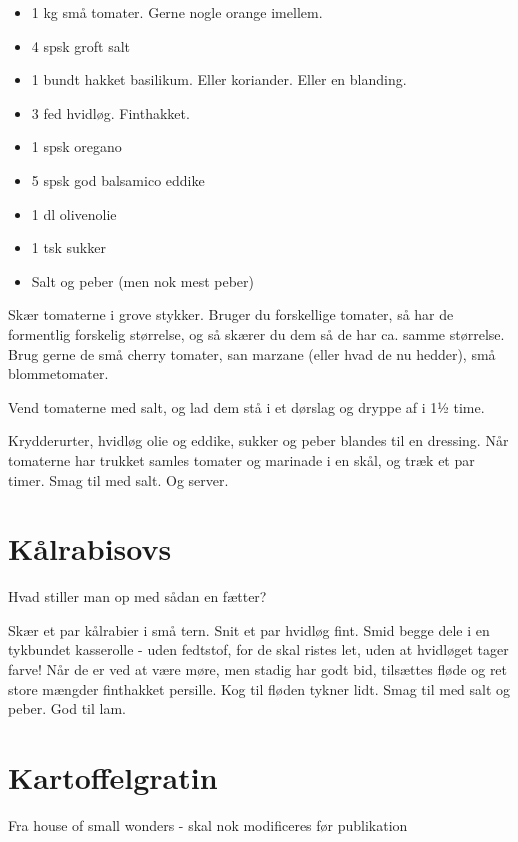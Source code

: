 \documentclass[
  letterpaper,
  DIV=11,
  numbers=noendperiod]{scrreprt}
\providecommand{\tightlist}{%
  \setlength{\itemsep}{0pt}\setlength{\parskip}{0pt}}\usepackage{longtable,booktabs,array}
\begin{document}
\begin{itemize}
\tightlist
\item
  1 kg små tomater. Gerne nogle orange imellem.
\item
  4 spsk groft salt
\item
  1 bundt hakket basilikum. Eller koriander. Eller en blanding.
\item
  3 fed hvidløg. Finthakket.
\item
  1 spsk oregano
\item
  5 spsk god balsamico eddike
\item
  1 dl olivenolie
\item
  1 tsk sukker
\item
  Salt og peber (men nok mest peber)
\end{itemize}

Skær tomaterne i grove stykker. Bruger du forskellige tomater, så har de
formentlig forskelig størrelse, og så skærer du dem så de har ca. samme
størrelse. Brug gerne de små cherry tomater, san marzane (eller hvad de
nu hedder), små blommetomater.

Vend tomaterne med salt, og lad dem stå i et dørslag og dryppe af i 1½
time.

Krydderurter, hvidløg olie og eddike, sukker og peber blandes til en
dressing. Når tomaterne har trukket samles tomater og marinade i en
skål, og træk et par timer. Smag til med salt. Og server.

\hypertarget{kuxe5lrabisovs}{%
\section{Kålrabisovs}\label{kuxe5lrabisovs}}

Hvad stiller man op med sådan en fætter?

Skær et par kålrabier i små tern. Snit et par hvidløg fint. Smid begge
dele i en tykbundet kasserolle - uden fedtstof, for de skal ristes let,
uden at hvidløget tager farve! Når de er ved at være møre, men stadig
har godt bid, tilsættes fløde og ret store mængder finthakket persille.
Kog til fløden tykner lidt. Smag til med salt og peber. God til lam.

\hypertarget{kartoffelgratin}{%
\section{Kartoffelgratin}\label{kartoffelgratin}}

Fra house of small wonders - skal nok modificeres før publikation
\end{document}
